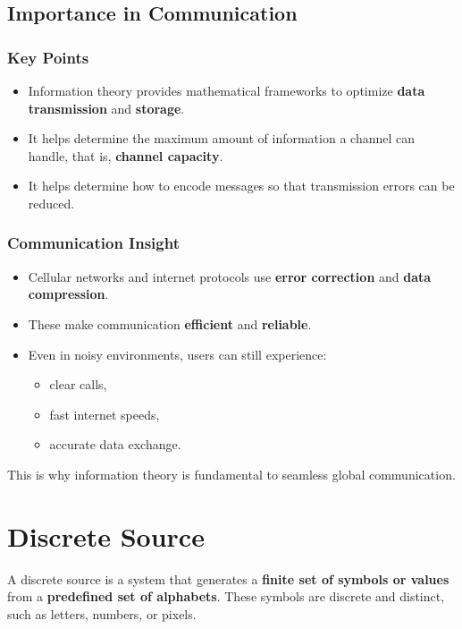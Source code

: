 \documentclass[11pt,a4paper]{book}
\newenvironment{definitionbox}[1][Definition]{%
    \begin{tcolorbox}[
        enhanced,
        breakable,
        colback=primaryblue!10,
        colframe=primaryblue!150,
        title=#1,
        fonttitle=\bfseries,
        sharp corners,
        boxrule=0.8pt,
        left=8pt,
        right=8pt,
        top=6pt,
        bottom=6pt
    ]
}{\end{tcolorbox}}
\begin{document}
\subsection{Importance in Communication}

\subsubsection{Key Points}
\begin{itemize}
    \item Information theory provides mathematical frameworks to optimize \textbf{data transmission} and \textbf{storage}.
    \item It helps determine the maximum amount of information a channel can handle, that is, \textbf{channel capacity}.
    \item It helps determine how to encode messages so that transmission errors can be reduced.
\end{itemize}

\subsubsection{Communication Insight}
\begin{itemize}
    \item Cellular networks and internet protocols use \textbf{error correction} and \textbf{data compression}.
    \item These make communication \textbf{efficient} and \textbf{reliable}.
    \item Even in noisy environments, users can still experience:
    \begin{itemize}
        \item clear calls,
        \item fast internet speeds,
        \item accurate data exchange.
    \end{itemize}
\end{itemize}

\noindent This is why information theory is fundamental to seamless global communication.

\clearpage

\section{Discrete Source}

\begin{definitionbox}[Discrete Source]
A discrete source is a system that generates a \textbf{finite set of symbols or values} from a \textbf{predefined set of alphabets}. These symbols are discrete and distinct, such as letters, numbers, or pixels.
\end{definitionbox}
\end{document}

